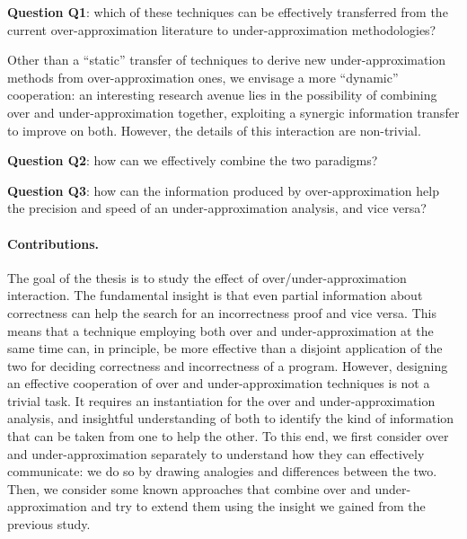 \noindent \textbf{Question Q1}: which of these techniques can be effectively transferred from the current over-approximation literature to under-approximation methodologies?

Other than a ``static'' transfer of techniques to derive new under-approximation methods from over-approximation ones, we envisage a more ``dynamic'' cooperation: an interesting research avenue lies in the possibility of combining over and under-approximation together, exploiting a synergic information transfer to improve on both. However, the details of this interaction are non-trivial.

\noindent \textbf{Question Q2}: how can we effectively combine the two paradigms?

\noindent \textbf{Question Q3}: how can the information produced by over-approximation help the precision and speed of an under-approximation analysis, and vice versa?

\paragraph*{Contributions.}
The goal of the thesis is to study the effect of over/under-approximation interaction.
The fundamental insight is that even partial information about correctness can help the search for an incorrectness proof and vice versa. This means that a technique employing both over and under-approximation at the same time can, in principle, be more effective than a disjoint application of the two for deciding correctness and incorrectness of a program.
However, designing an effective cooperation of over and under-approximation techniques is not a trivial task. It requires an instantiation for the over and under-approximation analysis, and insightful understanding of both to identify the kind of information that can be taken from one to help the other.
To this end, we first consider over and under-approximation separately to understand how they can effectively communicate: we do so by drawing analogies and differences between the two. Then, we consider some known approaches that combine over and under-approximation and try to extend them using the insight we gained from the previous study.

